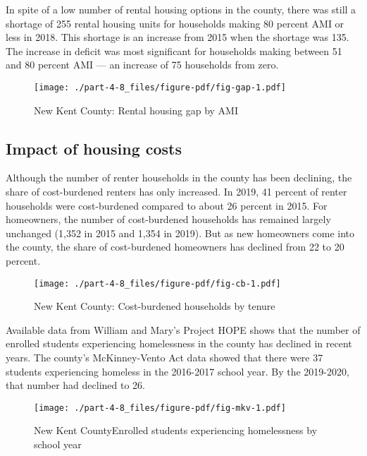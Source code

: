 \documentclass[
  letterpaper,
  DIV=11,
  numbers=noendperiod]{scrreprt}
\begin{document}
In spite of a low number of rental housing options in the county, there
was still a shortage of 255 rental housing units for households making
80 percent AMI or less in 2018. This shortage is an increase from 2015
when the shortage was 135. The increase in deficit was most significant
for households making between 51 and 80 percent AMI --- an increase of
75 households from zero.

\begin{figure}

{\centering \texttt{[image: ./part-4-8\_files/figure-pdf/fig-gap-1.pdf]}

}

\caption{\label{fig-gap}New Kent County: Rental housing gap by AMI}

\end{figure}

\hypertarget{impact-of-housing-costs-6}{%
\subsection{Impact of housing costs}\label{impact-of-housing-costs-6}}

Although the number of renter households in the county has been
declining, the share of cost-burdened renters has only increased. In
2019, 41 percent of renter households were cost-burdened compared to
about 26 percent in 2015. For homeowners, the number of cost-burdened
households has remained largely unchanged (1,352 in 2015 and 1,354 in
2019). But as new homeowners come into the county, the share of
cost-burdened homeowners has declined from 22 to 20 percent.

\begin{figure}

{\centering \texttt{[image: ./part-4-8\_files/figure-pdf/fig-cb-1.pdf]}

}

\caption{\label{fig-cb}New Kent County: Cost-burdened households by
tenure}

\end{figure}

Available data from William and Mary's Project HOPE shows that the
number of enrolled students experiencing homelessness in the county has
declined in recent years. The county's McKinney-Vento Act data showed
that there were 37 students experiencing homeless in the 2016-2017
school year. By the 2019-2020, that number had declined to 26.

\begin{figure}

{\centering \texttt{[image: ./part-4-8\_files/figure-pdf/fig-mkv-1.pdf]}

}

\caption{\label{fig-mkv}New Kent CountyEnrolled students experiencing
homelessness by school year}

\end{figure}
\end{document}
